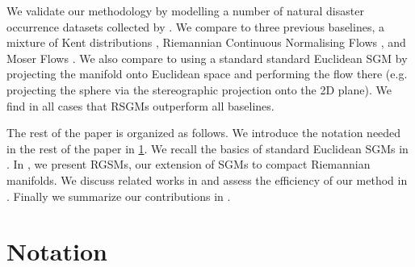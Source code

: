 
We validate our methodology by modelling a number of natural disaster occurrence datasets collected by \cite{mathieu2020riemannian}. We compare to three previous baselines, a mixture of Kent distributions \cite{peel2001fitting}, Riemannian Continuous Normalising Flows \cite{mathieu2020riemannian}, and Moser Flows \cite{rozen2021moser}. We also compare to using a standard standard Euclidean SGM by projecting the manifold onto Euclidean space and performing the flow there (e.g. projecting the sphere via the stereographic projection onto the 2D plane). We find in all cases that RSGMs outperform all baselines.


The rest of the paper is organized as follows. We introduce the notation needed
in the rest of the paper in \cref{sec:notation}. We recall the basics of
standard Euclidean SGMs in . In
, we present RGSMs, our extension of SGMs to compact
Riemannian manifolds. We discuss related works in
 and assess the efficiency of our method in
. %
Finally we summarize our contributions in .

\section{Notation}
\label{sec:notation}

